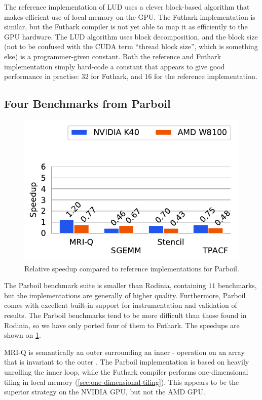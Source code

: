 The reference implementation of LUD uses a clever block-based
algorithm that makes efficient use of local memory on the GPU.  The
Futhark implementation is similar, but the Futhark compiler is not yet
able to map it as efficiently to the GPU hardware.  The LUD algorithm
uses block decomposition, and the block size (not to be confused with
the CUDA term ``thread block size'', which is something else) is a
programmer-given constant.  Both the reference and Futhark
implementation simply hard-code a constant that appears to give good
performance in practise: $32$ for Futhark, and $16$ for the reference
implementation.

\subsection{Four Benchmarks from Parboil}

\begin{figure}
  \centering
  \includegraphics[scale=0.65]{experiments/parboil.pdf}
  \caption{Relative speedup compared to reference implementations for Parboil.}
  \label{fig:parboil-speedup}
\end{figure}

The Parboil benchmark suite is smaller than Rodinia, containing $11$
benchmarks, but the implementations are generally of higher quality.
Furthermore, Parboil comes with excellent built-in support for
instrumentation and validation of results.  The Parboil benchmarks
tend to be more difficult than those found in Rodinia, so we have only
ported four of them to Futhark.  The speedups are shown on
\cref{fig:parboil-speedup}.

MRI-Q is semantically an outer  surrounding an inner
- operation on an array that is invariant to the
outer .  The Parboil implementation is based on heavily
unrolling the inner loop, while the Futhark compiler performs
one-dimensional tiling in local memory
(\cref{sec:one-dimensional-tiling}).  This appears to be the superior
strategy on the NVIDIA GPU, but not the AMD GPU.


